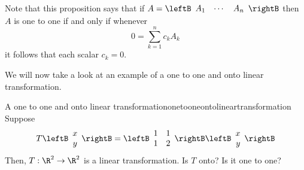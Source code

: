Note that this proposition says that if $A=\leftB
\begin{array}{ccc}
A_{1} & \cdots & A_{n}
\end{array}
\rightB $ then $A$ is one to one if and only if whenever
\begin{equation*}
0 = \sum_{k=1}^{n}c_{k}A_{k}
\end{equation*}
it follows that each scalar $c_{k}=0$. 

We will now take a look at an example of a one to one and onto linear transformation. 

\begin{example}{A one to one and onto linear transformation}{onetooneontolineartransformation}
Suppose
\begin{equation*}
T\leftB
\begin{array}{c}
x \\
y
\end{array}
\rightB =\leftB
\begin{array}{rr}
1 & 1 \\
1 & 2
\end{array}
\rightB \leftB
\begin{array}{r}
x \\
y
\end{array}
\rightB
\end{equation*}
Then, $T:\R^{2}\rightarrow \R^{2}$ is a linear
transformation. Is $T$ onto? Is it one to one?
\end{example}

